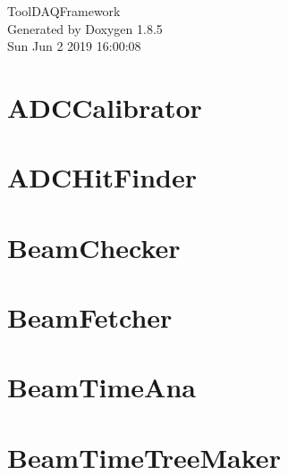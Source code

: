 \documentclass[twoside]{book}
\newcommand{\clearemptydoublepage}{%
  \newpage{\pagestyle{empty}\cleardoublepage}%
}
\begin{document}
\hypersetup{pageanchor=false}
\begin{titlepage}
\vspace*{7cm}
\begin{center}%
{\Large Tool\-D\-A\-Q\-Framework }\\
\vspace*{1cm}
{\large Generated by Doxygen 1.8.5}\\
\vspace*{0.5cm}
{\small Sun Jun 2 2019 16:00:08}\\
\end{center}
\end{titlepage}
\clearemptydoublepage
\tableofcontents
\clearemptydoublepage
{}
\hypersetup{pageanchor=true}

\chapter{A\-D\-C\-Calibrator}
\label{md_UserTools_ADCCalibrator_README}
\hypertarget{md_UserTools_ADCCalibrator_README}{}

\chapter{A\-D\-C\-Hit\-Finder}
\label{md_UserTools_ADCHitFinder_README}
\hypertarget{md_UserTools_ADCHitFinder_README}{}

\chapter{Beam\-Checker}
\label{md_UserTools_BeamChecker_README}
\hypertarget{md_UserTools_BeamChecker_README}{}

\chapter{Beam\-Fetcher}
\label{md_UserTools_BeamFetcher_README}
\hypertarget{md_UserTools_BeamFetcher_README}{}

\chapter{Beam\-Time\-Ana}
\label{md_UserTools_BeamTimeAna_README}
\hypertarget{md_UserTools_BeamTimeAna_README}{}

\chapter{Beam\-Time\-Tree\-Maker}
\label{md_UserTools_BeamTimeTreeMaker_README}
\hypertarget{md_UserTools_BeamTimeTreeMaker_README}{}

\end{document}
